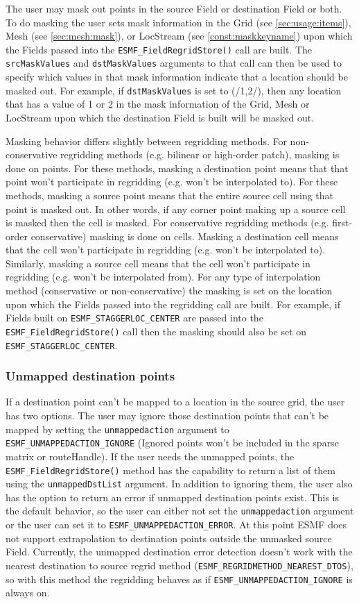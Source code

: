 The user may mask out points in the source
Field or destination Field or both. To do masking the user sets
mask information in the Grid (see \ref{sec:usage:items}), Mesh
(see \ref{sec:mesh:mask}), or LocStream (see \ref{const:maskkeyname})
upon which the Fields passed into the
{\tt ESMF\_FieldRegridStore()} call are built. The {\tt srcMaskValues}
and {\tt dstMaskValues} arguments to that
call can then be used to specify which values in that mask
information indicate that a location should be masked out. For
example, if {\tt dstMaskValues} is set to (/1,2/), then any location that
has a value of 1 or 2 in the mask information of the Grid, Mesh or LocStream
upon which the destination Field is built will be masked out.

Masking behavior differs slightly between regridding methods. For
non-conservative regridding methods (e.g. bilinear or high-order
patch), masking is done on points. For these methods, masking a
destination point means that that point won't participate in
regridding (e.g. won't be interpolated to). For these methods,
masking a source point means that the entire source cell using
that point is masked out. In other words, if any corner point
making up a source cell is masked then the cell is masked. For
conservative regridding methods (e.g. first-order conservative)
masking is done on cells. Masking a destination cell means that
the cell won't participate in regridding (e.g. won't be
interpolated to). Similarly, masking a source cell means that the
cell won't participate in regridding (e.g. won't be interpolated
from).  For any type of interpolation method (conservative or
non-conservative) the masking is set on the location upon
which the Fields passed into the regridding call are built.
For example, if Fields built on  {\tt ESMF\_STAGGERLOC\_CENTER} are
passed into the {\tt ESMF\_FieldRegridStore()} call then the masking
should also be set on {\tt ESMF\_STAGGERLOC\_CENTER}.


\subsubsection{Unmapped destination points}
 If a destination point can't be mapped to a location in the source grid, the user has two options. The user may ignore those destination points
 that can't be mapped by setting the {\tt unmappedaction} argument to {\tt ESMF\_UNMAPPEDACTION\_IGNORE} (Ignored points won't be included in
 the sparse matrix or routeHandle). If the user needs the unmapped points, the {\tt ESMF\_FieldRegridStore()} method has the capability to return
 a list of them using the {\tt unmappedDstList} argument.  In addition to ignoring them, the user also has the option to return
 an error if unmapped destination points exist. This is the default behavior, so the user can either not set the {\tt unmappedaction} argument
 or the user can set it to {\tt ESMF\_UNMAPPEDACTION\_ERROR}. At this point ESMF does not support extrapolation to destination points outside 
 the unmasked source Field. Currently, the unmapped destination error detection doesn't work with the nearest destination to source regrid method
({\tt ESMF\_REGRIDMETHOD\_NEAREST\_DTOS}), so with this method the regridding behaves as if {\tt ESMF\_UNMAPPEDACTION\_IGNORE} is always on. 

